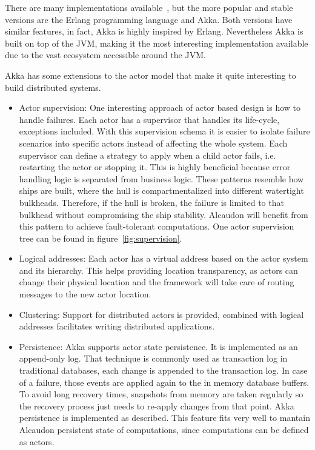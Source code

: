 There are many implementations available~\cite{wikiactor}, but the more popular
and stable versions are the Erlang programming language and Akka. Both versions
have similar features, in fact, Akka is highly inspired by Erlang. Nevertheless
Akka is built on top of the \ac{JVM}, making it the most interesting implementation
available due to the vast ecosystem accessible around the \acs{JVM}.

Akka has some extensions to the actor model that make it quite interesting to
build distributed systems.
%
\begin{itemize}
\item Actor supervision: One interesting approach of actor based design is how
  to handle failures. Each actor has a supervisor that handles its life-cycle,
  exceptions included. With this supervision schema it is easier to isolate failure
  scenarios into specific actors instead of affecting the whole system. Each
  supervisor can define a strategy to apply when a child actor fails, i.e.
  restarting the actor or stopping it. This is highly beneficial because error
  handling logic is separated from business logic. These patterns resemble how
  ships are built, where the hull is compartmentalized into different watertight
  bulkheads. Therefore, if the hull is broken, the failure is limited to that
  bulkhead without compromising the ship stability. Alcaudon will benefit from
  this pattern to achieve fault-tolerant computations. One actor supervision
  tree can be found in figure~\ref{fig:supervision}.
\item Logical addresses: Each actor has a virtual address based on the actor
  system and its hierarchy. This helps providing location transparency, as
  actors can change their physical location and the framework will take care of
  routing messages to the new actor location.
\item Clustering: Support for distributed actors is provided, combined with
  logical addresses facilitates writing distributed applications.
\item Persistence: Akka supports actor state persistence. It is implemented as
  an append-only log. That technique is commonly used as transaction log in
  traditional databases, each change is appended to the transaction log. In case
  of a failure, those events are applied again to the in memory database
  buffers. To avoid long recovery times, snapshots from memory are taken
  regularly so the recovery process just needs to re-apply changes from that
  point. Akka persistence is implemented as described. This feature fits very
  well to mantain Alcaudon persistent state of computations, since computations
  can be defined as actors.
\end{itemize}

